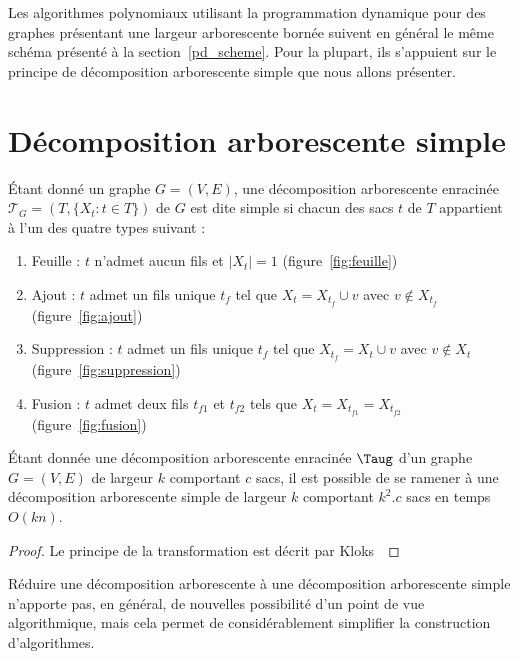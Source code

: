 Les algorithmes polynomiaux utilisant la programmation dynamique pour des graphes présentant une
largeur arborescente bornée suivent en général le même schéma présenté à la
section~\ref{pd_scheme}. Pour la plupart, ils s'appuient sur le principe de décomposition
arborescente simple que nous allons présenter.

\section{Décomposition arborescente simple}

\begin{ndf}
    Étant donné un graphe $G=(V,E)$, une décomposition arborescente enracinée $\mathcal{T}_G = (T,
    \{X_t : t \in T\})$ de $G$ est dite simple si chacun des sacs $t$ de $T$ appartient à l'un des
    quatre types suivant :
    \begin{enumerate}
        \item Feuille : $t$ n'admet aucun fils et $|X_t| = 1$ (figure~\ref{fig:feuille})
        \item Ajout : $t$ admet un fils unique $t_f$ tel que $X_t = X_{t_f} \cup v$ avec $v \not
            \in X_{t_f}$ (figure~\ref{fig:ajout})
        \item Suppression : $t$ admet un fils unique $t_f$ tel que $X_{t_f} = X_t \cup v$ avec $v
            \not \in X_t$ (figure~\ref{fig:suppression}) 
        \item Fusion : $t$ admet deux fils $t_{f1}$ et $t_{f2}$ tels que $X_t = X_{t_{f1}} =
            X_{t_{f2}}$ (figure~\ref{fig:fusion})
    \end{enumerate}
\end{ndf}

\begin{nthrm}
    \label{pd_red}
    Étant donnée une décomposition arborescente enracinée $\Taug$ d'un graphe $G=(V,E)$ de largeur
    $k$ comportant $c$ sacs, il est possible de se ramener à une décomposition arborescente simple de
    largeur $k$ comportant $k^2.c$ sacs en temps $O(kn)$.
\end{nthrm}

\begin{proof}
    Le principe de la transformation est décrit par Kloks~\cite{klo94}
\end{proof}

Réduire une décomposition arborescente à une décomposition arborescente simple n'apporte pas, en
général, de nouvelles possibilité d'un point de vue algorithmique, mais cela permet de
considérablement simplifier la construction d'algorithmes.

